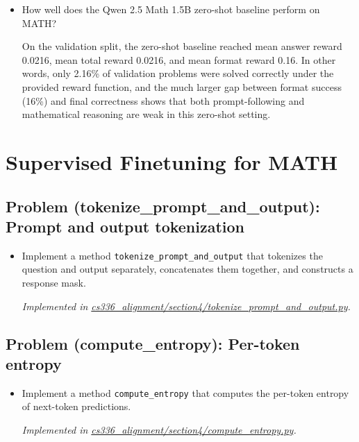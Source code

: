 \documentclass[letterpaper]{article}
\newcommand{\repofile}[2]{\href{https://github.com/echung32/ece405-assignment3-alignment/blob/main/#1}{#2}}
\begin{document}
\begin{itemize}
		\item[(c)] How well does the Qwen 2.5 Math 1.5B zero-shot baseline perform on MATH?
		
		On the validation split, the zero-shot baseline reached mean answer reward 0.0216, mean total reward 0.0216, and mean format reward 0.16. In other words, only 2.16\% of validation problems were solved correctly under the provided reward function, and the much larger gap between format success (16\%) and final correctness shows that both prompt-following and mathematical reasoning are weak in this zero-shot setting.
		
	\end{itemize}
	
	\section{Supervised Finetuning for MATH}
	
	\subsection{Problem (tokenize\_prompt\_and\_output): Prompt and output tokenization}
	
	\begin{itemize}
		\item[(a)] Implement a method \texttt{tokenize\_prompt\_and\_output} that tokenizes the question and output separately, concatenates them together, and constructs a response mask.
		
		\textit{Implemented in \repofile{cs336_alignment/section4/tokenize_prompt_and_output.py}{cs336\_alignment/section4/tokenize\_prompt\_and\_output.py}.}
		
	\end{itemize}
	
	\subsection{Problem (compute\_entropy): Per-token entropy}
	
	\begin{itemize}
		\item[(a)] Implement a method \texttt{compute\_entropy} that computes the per-token entropy of next-token predictions.
		
		\textit{Implemented in \repofile{cs336_alignment/section4/compute_entropy.py}{cs336\_alignment/section4/compute\_entropy.py}.}
		
	\end{itemize}
	
\end{document}
